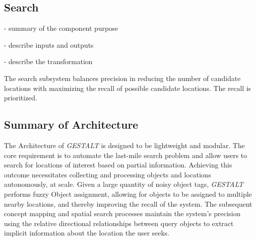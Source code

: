 \subsection{Search}
- summary of the component purpose

- describe inputs and outputs

- describe the transformation

The search subsystem balances precision in reducing the number of candidate locations with maximizing the recall of possible candidate locations. The recall is prioritized.

\subsection{Summary of Architecture}
The Architecture of \textit{GESTALT} is designed to be lightweight and modular. The core requirement is to automate the last-mile search problem and allow users to search for locations of interest based on partial information. 
Achieving this outcome necessitates collecting and processing objects and locations autonomously, at scale.
Given a large quantity of noisy object tags, \emph{GESTALT} performs fuzzy Object assignment, allowing for objects to be assigned to multiple nearby locations, and thereby improving the recall of the system.
The subsequent concept mapping and spatial search processes maintain the system's precision using the relative directional relationships between query objects to extract implicit information about the location the user seeks. 